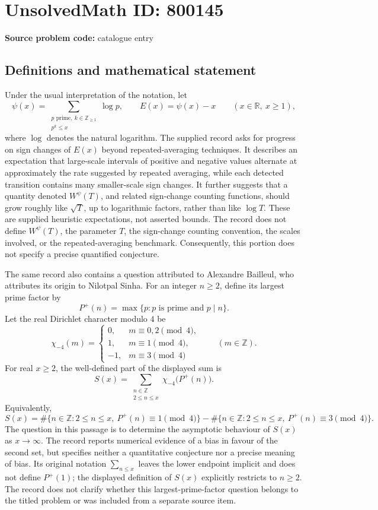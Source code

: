 \documentclass[11pt]{article}
\newcommand{\Z}{\mathbb{Z}}
\newcommand{\R}{\mathbb{R}}
\begin{document}
\section*{UnsolvedMath ID: 800145}
\textbf{Source problem code:} catalogue entry
\subsection{Definitions and mathematical statement}
Under the usual interpretation of the notation, let
\[
\psi(x)=\sum_{\substack{p\text{ prime},\ k\in\Z_{\ge1}\\p^k\le x}}\log p,
\qquad E(x)=\psi(x)-x\qquad(x\in\R,\ x\ge1),
\]
where \(\log\) denotes the natural logarithm. The supplied record asks for progress on sign changes of \(E(x)\) beyond repeated-averaging techniques. It describes an expectation that large-scale intervals of positive and negative values alternate at approximately the rate suggested by repeated averaging, while each detected transition contains many smaller-scale sign changes. It further suggests that a quantity denoted \(W^\psi(T)\), and related sign-change counting functions, should grow roughly like \(\sqrt T\), up to logarithmic factors, rather than like \(\log T\). These are supplied heuristic expectations, not asserted bounds. The record does not define \(W^\psi(T)\), the parameter \(T\), the sign-change counting convention, the scales involved, or the repeated-averaging benchmark. Consequently, this portion does not specify a precise quantified conjecture.

The same record also contains a question attributed to Alexandre Bailleul, who attributes its origin to Nilotpal Sinha. For an integer \(n\ge2\), define its largest prime factor by
\[
P^+(n)=\max\{p:p\text{ is prime and }p\mid n\}.
\]
Let the real Dirichlet character modulo \(4\) be
\[
\chi_{-4}(m)=
\begin{cases}
0,&m\equiv0,2\pmod4,\\
1,&m\equiv1\pmod4,\\
-1,&m\equiv3\pmod4
\end{cases}
\qquad(m\in\Z).
\]
For real \(x\ge2\), the well-defined part of the displayed sum is
\[
S(x)=\sum_{\substack{n\in\Z\\2\le n\le x}}\chi_{-4}\bigl(P^+(n)\bigr).
\]
Equivalently,
\[
S(x)=\#\{n\in\Z:2\le n\le x,\ P^+(n)\equiv1\pmod4\}
-\#\{n\in\Z:2\le n\le x,\ P^+(n)\equiv3\pmod4\}.
\]
The question in this passage is to determine the asymptotic behaviour of \(S(x)\) as \(x\to\infty\). The record reports numerical evidence of a bias in favour of the second set, but specifies neither a quantitative conjecture nor a precise meaning of bias. Its original notation \(\sum_{n\le x}\) leaves the lower endpoint implicit and does not define \(P^+(1)\); the displayed definition of \(S(x)\) explicitly restricts to \(n\ge2\). The record does not clarify whether this largest-prime-factor question belongs to the titled problem or was included from a separate source item.
\end{document}
